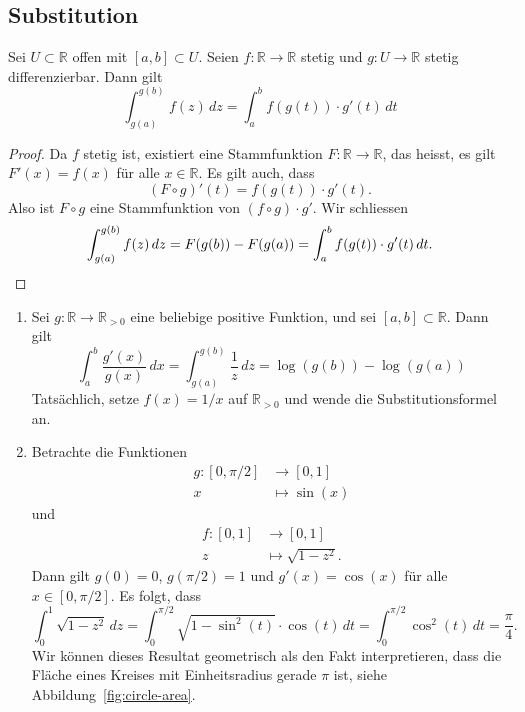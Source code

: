 \documentclass[../main.tex]{subfiles}
\begin{document}
\subsection*{Substitution}
\begin{substitution}
  Sei $U \subset \mathbb{R}$ offen
  mit $[a, b] \subset U$.
  Seien $f \colon \mathbb{R} \to \mathbb{R}$ stetig
  und $g \colon U \to \mathbb{R}$ stetig differenzierbar.
  Dann gilt
  \[
    \int_{g(a)}^{g(b)} f(z) \, dz
    = \int_{a}^{b} f(g(t)) \cdot g'(t) \, dt
  \]
\end{substitution}

\begin{proof}
  Da $f$ stetig ist, existiert
  eine Stammfunktion $F \colon \mathbb{R} \to \mathbb{R}$,
  das heisst,
  es gilt $F'(x) = f(x)$ für alle $x \in \mathbb{R}$.
  Es gilt auch, dass
  \[
    (F \circ g)'(t) = f(g(t)) \cdot g'(t).
  \]
  Also ist $F \circ g$ eine Stammfunktion
  von $(f \circ g) \cdot g'$.
  Wir schliessen
  \[
    \int_{g(a)}^{g(b)} f(z) \, dz
    = F(g(b)) - F(g(a))
    = \int_{a}^{b} f(g(t)) \cdot g'(t) \, dt. \qedhere
  \]
\end{proof}

\begin{examples}
  \leavevmode
  \begin{enumerate}[(1)]
    \item Sei $g \colon \mathbb{R} \to \mathbb{R}_{>0}$ 
      eine beliebige positive Funktion,
      und sei $[a, b] \subset \mathbb{R}$.
      Dann gilt
      \[
        \int_{a}^{b} \frac{g'(x)}{g(x)} \, dx
        = \int_{g(a)}^{g(b)} \frac{1}{z} \, dz
        = \log(g(b)) - \log(g(a))
      \]
      Tatsächlich, setze $f(x) = 1/x$ auf $\mathbb{R}_{>0}$
      und wende die Substitutionsformel an.
    \item Betrachte die Funktionen
      \begin{align*}
        g \colon [0, \pi/2] & \to [0, 1] \\
        x & \mapsto \sin(x)
      \end{align*}
      und
      \begin{align*}
        f \colon [0, 1] & \to [0, 1] \\
        z & \mapsto \sqrt{1- z^2}.
      \end{align*}
      Dann gilt $g(0) = 0$, $g(\pi/2) = 1$ 
      und $g'(x) = \cos(x)$ für alle $x \in [0, \pi/2]$.
      Es folgt, dass
      \[
        \int_{0}^{1} \sqrt{1 - z^2} \, dz
        = \int_{0}^{\pi/2} \sqrt{1 - \sin^2(t)}
        \cdot \cos(t)\, dt
        = \int_{0}^{\pi/2} \cos^2(t) \, dt
        = \frac{\pi}{4}.
      \]
      Wir können dieses Resultat geometrisch als den Fakt
      interpretieren, dass die Fläche eines Kreises 
      mit Einheitsradius gerade $\pi$ ist, siehe
      Abbildung~\ref{fig:circle-area}.
  \end{enumerate}
\end{examples}
\end{document}

